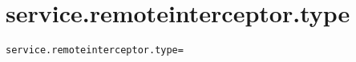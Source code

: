 \section{service.remoteinterceptor.type}
\label{configuration:ServiceRemoteinterceptorType}
\ClearAPI
\TODO
\begin{lstlisting}[style=Props,caption={Usage example for \textit{service.remoteinterceptor.type}}]
service.remoteinterceptor.type=
\end{lstlisting}